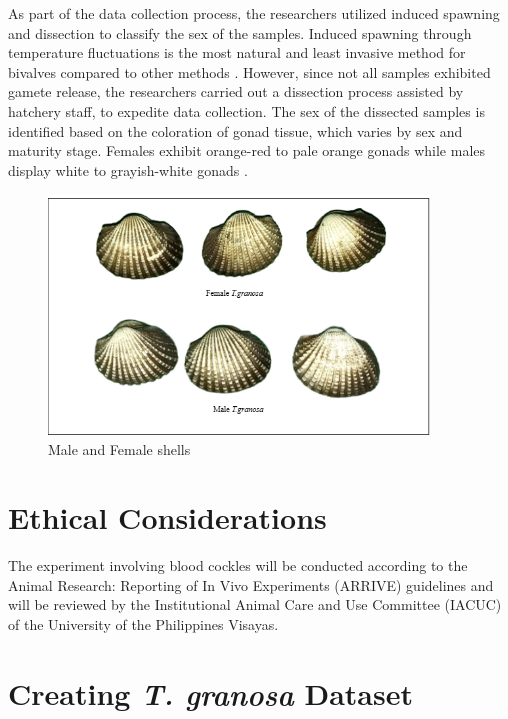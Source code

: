 As part of the data collection process, the researchers utilized induced spawning and dissection to classify the sex of the samples. Induced spawning through temperature fluctuations is the most natural and least invasive method for bivalves compared to other methods \cite{aji}. However, since not all samples exhibited gamete release, the researchers carried out a dissection process assisted by hatchery staff, to expedite data collection. The sex of the dissected samples is identified based on the coloration of gonad tissue, which varies by sex and maturity stage. Females exhibit orange-red to pale orange gonads while males display white to grayish-white gonads \cite{may2021}. 

\begin{figure}[!htbp]
	\centering
	\includegraphics[width=0.9\textwidth]{figures/male-female T.granosa.png}
	\caption{Male and Female \Tegillarcagranosa shells}
	\label{fig:granosa_shells}
\end{figure}

\section{Ethical Considerations}
\label{sec:ethical}

The experiment involving blood cockles will be conducted according to the Animal Research: Reporting of In Vivo Experiments (ARRIVE) guidelines and will be reviewed by the Institutional Animal Care and Use Committee (IACUC) of the University of the Philippines Visayas. 

\section{Creating \textit{T. granosa} Dataset}
\label{sec:dataset}

